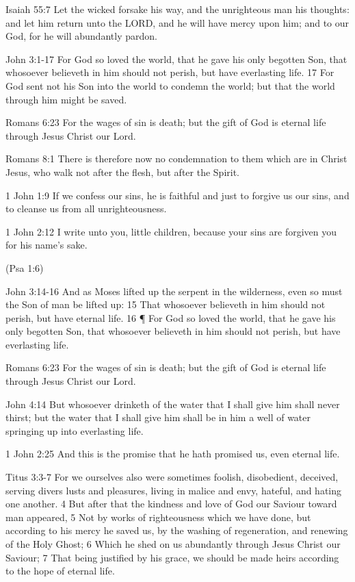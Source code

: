 \begin{compactenum}[I.]
\begin{compactenum}[A.]
    	\item Isaiah 55:7  Let the wicked forsake his way, and the unrighteous man his thoughts: and let him return unto the LORD, and he will have mercy upon him; and to our God, for he will abundantly pardon.
    	\item John 3:1-17 For God so loved the world, that he gave his only begotten Son, that whosoever believeth in him should not perish, but have everlasting life. 17 For God sent not his Son into the world to condemn the world; but that the world through him might be saved.
    	\item Romans 6:23 For the wages of sin is death; but the gift of God is eternal life through Jesus Christ our Lord.
    	\item Romans 8:1 There is therefore now no condemnation to them which are in Christ Jesus, who walk not after the flesh, but after the Spirit.
		\item 1 John 1:9 If we confess our sins, he is faithful and just to forgive us our sins, and to cleanse us from all unrighteousness.
		\item 1 John 2:12 I write unto you, little children, because your sins are forgiven you for his name’s sake.
    \end{compactenum}
    \item {} (Psa 1:6)
    \begin{compactenum}[A.]
		\item John 3:14-16 And as Moses lifted up the serpent in the wilderness, even so must the Son of man be lifted up: 15 That whosoever believeth in him should not perish, but have eternal life.
16 ¶ For God so loved the world, that he gave his only begotten Son, that whosoever believeth in him should not perish, but have everlasting life.
		\item Romans 6:23 For the wages of sin is death; but the gift of God is eternal life through Jesus Christ our Lord.
		\item John 4:14  But whosoever drinketh of the water that I shall give him shall never thirst; but the water that I shall give him shall be in him a well of water springing up into everlasting life.
		\item 1 John 2:25 And this is the promise that he hath promised us, even eternal life.
		\item Titus 3:3-7 For we ourselves also were sometimes foolish, disobedient, deceived, serving divers lusts and pleasures, living in malice and envy, hateful, and hating one another. 4 But after that the kindness and love of God our Saviour toward man appeared, 5 Not by works of righteousness which we have done, but according to his mercy he saved us, by the washing of regeneration, and renewing of the Holy Ghost; 6 Which he shed on us abundantly through Jesus Christ our Saviour; 7 That being justified by his grace, we should be made heirs according to the hope of eternal life. 

\end{compactenum}
\end{compactenum}
